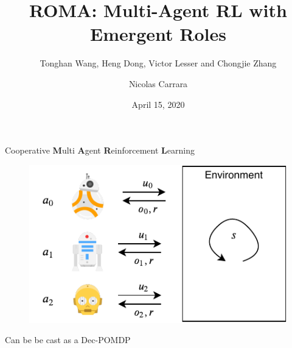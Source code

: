 \documentclass{beamer}
\author[shortname]{Nicolas Carrara}
\institute[shortinst]{University of Toronto}
\title[ROMA]{ROMA: Multi-Agent RL with Emergent Roles}
\subtitle{Tonghan Wang, Heng Dong, Victor Lesser and Chongjie Zhang}
\date{April 15, 2020}
\begin{document}
    \begin{frame}
        \maketitle
        \centering
    \end{frame}

    \begin{frame}{Cooperative \textbf{M}ulti \textbf{A}gent \textbf{R}einforcement \textbf{L}earning}

        \begin{figure}
            \includegraphics[width=0.75\linewidth]{img/marl.pdf}
        \end{figure}
        \pause
        \begin{exampleblock}{}
            Can be be cast as a Dec-POMDP
        \end{exampleblock}

    \end{frame}
\end{document}
